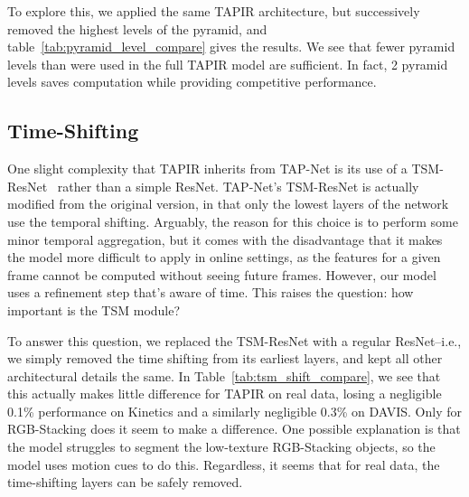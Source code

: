 \documentclass[10pt,twocolumn,letterpaper]{article}
\begin{document}
To explore this, we applied the same TAPIR architecture, but successively removed the highest levels of the pyramid, and table~\ref{tab:pyramid_level_compare} gives the results.  We see that fewer pyramid levels than were used in the full TAPIR model are sufficient.  In fact, 2 pyramid levels saves computation while providing competitive performance.  

\begin{table}[t]
\caption{Comparing the TAPIR model with a version without the TSM (temporal shift module).}
\label{tab:tsm_shift_compare}
\end{table}

\subsection{Time-Shifting}
\label{sec:time_shifting}
One slight complexity that TAPIR inherits from TAP-Net is its use of a TSM-ResNet~\cite{lin2020tsm} rather than a simple ResNet.  TAP-Net's TSM-ResNet is actually modified from the original version, in that only the lowest layers of the network use the temporal shifting.  Arguably, the reason for this choice is to perform some minor temporal aggregation, but it comes with the disadvantage that it makes the model more difficult to apply in online settings, as the features for a given frame cannot be computed without seeing future frames.  However, our model uses a refinement step that's aware of time.  This raises the question: how important is the TSM module?

To answer this question, we replaced the TSM-ResNet with a regular ResNet--i.e., we simply removed the time shifting from its earliest layers, and kept all other architectural details the same.  In Table~\ref{tab:tsm_shift_compare}, we see that this actually makes little difference for TAPIR on real data, losing a negligible 0.1\% performance on Kinetics and a similarly negligible 0.3\% on DAVIS.  Only for RGB-Stacking does it seem to make a difference.  One possible explanation is that the model struggles to segment the low-texture RGB-Stacking objects, so the model uses motion cues to do this.  Regardless, it seems that for real data, the time-shifting layers can be safely removed.
\end{document}
